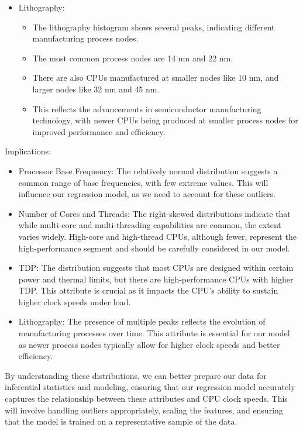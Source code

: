 \begin{itemize}
    \item Lithography: 
    \begin{itemize}
        \item The lithography histogram shows several peaks, indicating different manufacturing process nodes.
        \item The most common process nodes are 14 nm and 22 nm.
        \item There are also CPUs manufactured at smaller nodes like 10 nm, and larger nodes like 32 nm and 45 nm.
        \item This reflects the advancements in semiconductor manufacturing technology, with newer CPUs being produced at smaller process nodes for improved performance and efficiency.
    \end{itemize}

\end{itemize}

Implications:
\begin{itemize}
    \item Processor Base Frequency: The relatively normal distribution suggests a common range of base frequencies, with few extreme values. This will influence our regression model, as we need to account for these outliers.

    \item Number of Cores and Threads: The right-skewed distributions indicate that while multi-core and multi-threading capabilities are common, the extent varies widely. High-core and high-thread CPUs, although fewer, represent the high-performance segment and should be carefully considered in our model.

    \item TDP: The distribution suggests that most CPUs are designed within certain power and thermal limits, but there are high-performance CPUs with higher TDP. This attribute is crucial as it impacts the CPU's ability to sustain higher clock speeds under load.

    \item Lithography: The presence of multiple peaks reflects the evolution of manufacturing processes over time. This attribute is essential for our model as newer process nodes typically allow for higher clock speeds and better efficiency.
\end{itemize}
By understanding these distributions, we can better prepare our data for inferential statistics and modeling, ensuring that our regression model accurately captures the relationship between these attributes and CPU clock speeds. This will involve handling outliers appropriately, scaling the features, and ensuring that the model is trained on a representative sample of the data.

